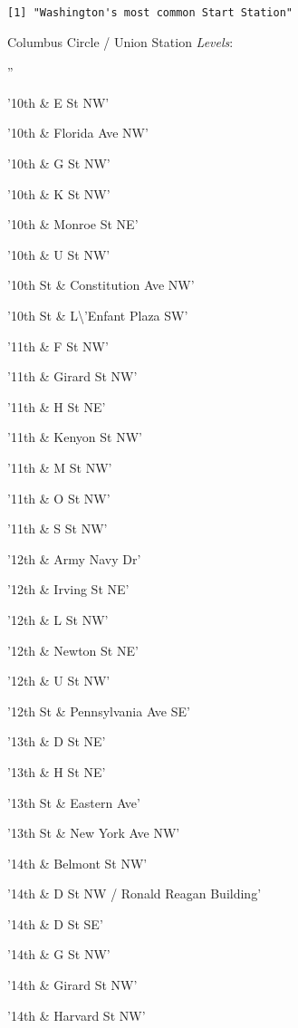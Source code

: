 \documentclass[11pt]{article}
\begin{document}
    
    \begin{Verbatim}[commandchars=\\\{\}]
[1] "Washington's most common Start Station"

    \end{Verbatim}

    Columbus Circle / Union Station
\emph{Levels}: \begin{enumerate*}
\item ''
\item '10th \& E St NW'
\item '10th \& Florida Ave NW'
\item '10th \& G St NW'
\item '10th \& K St NW'
\item '10th \& Monroe St NE'
\item '10th \& U St NW'
\item '10th St \& Constitution Ave NW'
\item '10th St \& L\textbackslash{}'Enfant Plaza SW'
\item '11th \& F St NW'
\item '11th \& Girard St NW'
\item '11th \& H St NE'
\item '11th \& Kenyon St NW'
\item '11th \& M St NW'
\item '11th \& O St NW'
\item '11th \& S St NW'
\item '12th \& Army Navy Dr'
\item '12th \& Irving St NE'
\item '12th \& L St NW'
\item '12th \& Newton St NE'
\item '12th \& U St NW'
\item '12th St \& Pennsylvania Ave SE'
\item '13th \& D St NE'
\item '13th \& H St NE'
\item '13th St \& Eastern Ave'
\item '13th St \& New York Ave NW'
\item '14th \& Belmont St NW'
\item '14th \& D St NW / Ronald Reagan Building'
\item '14th \& D St SE'
\item '14th \& G St NW'
\item '14th \& Girard St NW'
\item '14th \& Harvard St NW'

\end{enumerate*}
\end{document}
